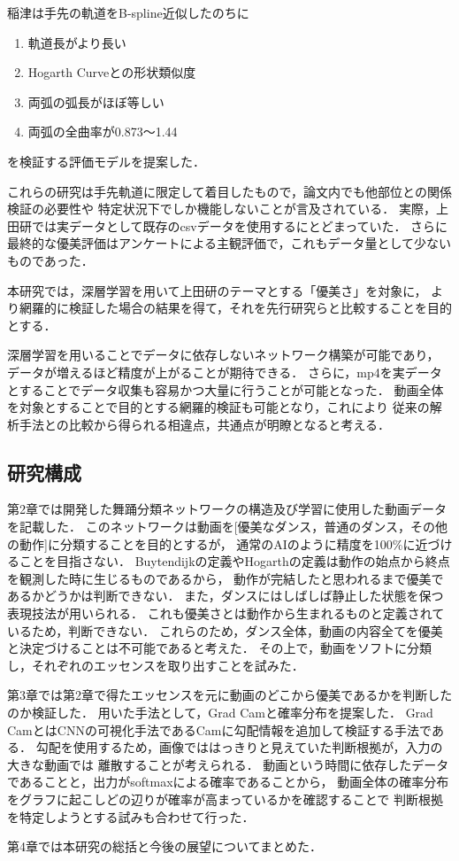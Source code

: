 \clearpage

稲津は手先の軌道をB-spline近似したのちに
\begin{enumerate}
  \item 軌道長がより長い
  \item Hogarth Curveとの形状類似度
  \item 両弧の弧長がほぼ等しい
  \item 両弧の全曲率が0.873〜1.44
\end{enumerate}
を検証する評価モデルを提案した．

これらの研究は手先軌道に限定して着目したもので，論文内でも他部位との関係検証の必要性や
特定状況下でしか機能しないことが言及されている．
実際，上田研では実データとして既存のcsvデータを使用するにとどまっていた．
さらに最終的な優美評価はアンケートによる主観評価で，これもデータ量として少ないものであった．

本研究では，深層学習を用いて上田研のテーマとする「優美さ」を対象に，
より網羅的に検証した場合の結果を得て，それを先行研究らと比較することを目的とする．

深層学習を用いることでデータに依存しないネットワーク構築が可能であり，
データが増えるほど精度が上がることが期待できる．
さらに，mp4を実データとすることでデータ収集も容易かつ大量に行うことが可能となった．
動画全体を対象とすることで目的とする網羅的検証も可能となり，これにより
従来の解析手法との比較から得られる相違点，共通点が明瞭となると考える．

\subsection{研究構成}
第2章では開発した舞踊分類ネットワークの構造及び学習に使用した動画データを記載した．
このネットワークは動画を[優美なダンス，普通のダンス，その他の動作]に分類することを目的とするが，
通常のAIのように精度を100\%に近づけることを目指さない．
Buytendijkの定義やHogarthの定義は動作の始点から終点を観測した時に生じるものであるから，
動作が完結したと思われるまで優美であるかどうかは判断できない．
また，ダンスにはしばしば静止した状態を保つ表現技法が用いられる．
これも優美さとは動作から生まれるものと定義されているため，判断できない．
これらのため，ダンス全体，動画の内容全てを優美と決定づけることは不可能であると考えた．
その上で，動画をソフトに分類し，それぞれのエッセンスを取り出すことを試みた．

第3章では第2章で得たエッセンスを元に動画のどこから優美であるかを判断したのか検証した．
用いた手法として，Grad Cam\cite{gradcam}と確率分布を提案した．
Grad CamとはCNNの可視化手法であるCam\cite{cam}に勾配情報を追加して検証する手法である．
勾配を使用するため，画像でははっきりと見えていた判断根拠が，入力の大きな動画では
離散することが考えられる．
動画という時間に依存したデータであることと，出力がsoftmaxによる確率であることから，
動画全体の確率分布をグラフに起こしどの辺りが確率が高まっているかを確認することで
判断根拠を特定しようとする試みも合わせて行った．

第4章では本研究の総括と今後の展望についてまとめた．
